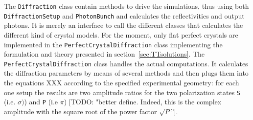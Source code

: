 \documentclass[preprint]{iucr}              %
\newcommand{\todo}[1]{{\color{red}[TODO: "#1'']}}
\newcommand{\inred}[1]{{\color{red}#1}}
\begin{document}





The {\tt Diffraction} class contain methods to drive the simulations, thus using both {\tt DiffractionSetup} and {\tt PhotonBunch} and calculates the reflectivities and output photons. It is merely an interface to call the different classes that calculates the different kind of crystal models. For the moment, only flat perfect crystals are implemented in the {\tt PerfectCrystalDiffraction} class implementing the formulation and theory presented in section~\ref{sec:TTsolutions}. The {\tt PerfectCrystalDiffraction} class handles the actual computations. 
\inred{It calculates the diffraction parameters by means of
several methods and then plugs them into the equations XXX according to the specified experimental geometry: for each
one setup the results are two amplitude ratios for the two polarization
states {\tt S} (i.e. $\sigma)$) and {\tt P} (i.e $\pi$) \todo{better define. Indeed, this is the complex amplitude with the square root of the power factor $\sqrt{P}$}.
}
\end{document}
